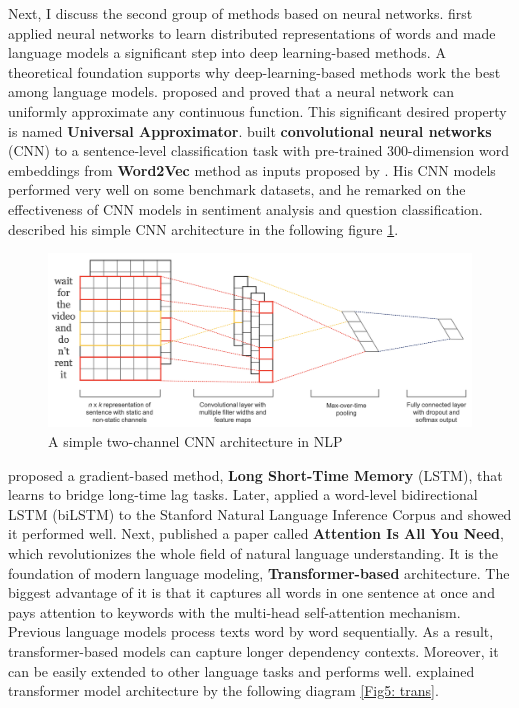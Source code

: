 \documentclass[aoas]{imsart}
\numberwithin{equation}{section}
\theoremstyle{plain}
\theoremstyle{remark}
\begin{document}
Next, I discuss the second group of methods based on neural networks. \cite{bengio2000neural} first applied neural networks to learn distributed representations of words and made language models a significant step into deep learning-based methods. A theoretical foundation supports why deep-learning-based methods work the best among language models. \cite{appro} proposed and proved that a neural network can uniformly approximate any continuous function. This significant desired property is named \textbf{Universal Approximator}. \cite{DBLP:journals/corr/Kim14f} built \textbf{convolutional neural networks} (CNN) to a sentence-level classification task with pre-trained 300-dimension word embeddings from \textbf{Word2Vec} method as inputs proposed by \cite{DBLP:journals/corr/MikolovSCCD13}. His CNN models performed very well on some benchmark datasets, and he remarked on the effectiveness of CNN models in sentiment analysis and question classification. \cite{DBLP:journals/corr/Kim14f} described his simple CNN architecture in the following figure \ref{Fig5: cnn}.
\begin{figure}[ht]
\includegraphics[scale=0.4]{img/cnn.png}
\caption{A simple two-channel CNN architecture in NLP}
\label{Fig5: cnn}
\end{figure}
\cite{10.1162/neco.1997.9.8.1735} proposed a gradient-based method, \textbf{Long Short-Time Memory} (LSTM), that learns to bridge long-time lag tasks. Later, \cite{DBLP:journals/corr/LiuSLW16} applied a word-level bidirectional LSTM (biLSTM) to the Stanford Natural Language Inference Corpus and showed it performed well. Next, \cite{DBLP:journals/corr/VaswaniSPUJGKP17} published a paper called \textbf{Attention Is All You Need}, which revolutionizes the whole field of natural language understanding. It is the foundation of modern language modeling, \textbf{Transformer-based} architecture. The biggest advantage of it is that it captures all words in one sentence at once and pays attention to keywords with the multi-head self-attention mechanism. Previous language models process texts word by word sequentially. As a result, transformer-based models can capture longer dependency contexts. Moreover, it can be easily extended to other language tasks and performs well. \cite{DBLP:journals/corr/VaswaniSPUJGKP17} explained transformer model architecture by the following diagram \ref{Fig5: trans}.
\end{document}

